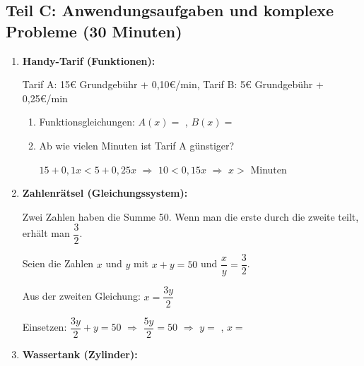 \subsection*{Teil C: Anwendungsaufgaben und komplexe Probleme (30 Minuten)}

\begin{enumerate}[label=\arabic*., resume]

    \item \textbf{Handy-Tarif (Funktionen):}
    \vspace{0.5cm}

    Tarif A: 15€ Grundgebühr + 0,10€/min, Tarif B: 5€ Grundgebühr + 0,25€/min

    \begin{enumerate}[label=\alph*)]
        \item Funktionsgleichungen: $A(x) =$ \underline{\hspace{3cm}}, $B(x) =$ \underline{\hspace{3cm}}
        \vspace{0.3cm}
        \item Ab wie vielen Minuten ist Tarif A günstiger?

        $15 + 0{,}1x < 5 + 0{,}25x$ $\Rightarrow$ $10 < 0{,}15x$ $\Rightarrow$ $x >$ \underline{\hspace{2cm}} Minuten
    \end{enumerate}

    \vspace{1cm}

    \item \textbf{Zahlenrätsel (Gleichungssystem):}
    \vspace{0.5cm}

    Zwei Zahlen haben die Summe 50. Wenn man die erste durch die zweite teilt, erhält man $\dfrac{3}{2}$.

    Seien die Zahlen $x$ und $y$ mit $x + y = 50$ und $\dfrac{x}{y} = \dfrac{3}{2}$.

    Aus der zweiten Gleichung: $x = \dfrac{3y}{2}$

    Einsetzen: $\dfrac{3y}{2} + y = 50$ $\Rightarrow$ $\dfrac{5y}{2} = 50$ $\Rightarrow$ $y =$ \underline{\hspace{2cm}}, $x =$ \underline{\hspace{2cm}}

    \vspace{1cm}

    \item \textbf{Wassertank (Zylinder):}
    \vspace{0.5cm}


\end{enumerate}
